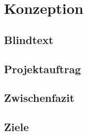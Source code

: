 \chapter{Konzeption}
\label{Konzeption}

\section{Blindtext}
\Blindtext[2][3] 


\section {Projektauftrag}
\label{eruierte_Komponenten}

\section{Zwischenfazit}
\label{Zwischenfazit_konzept}

\section{Ziele}
\blinditemize